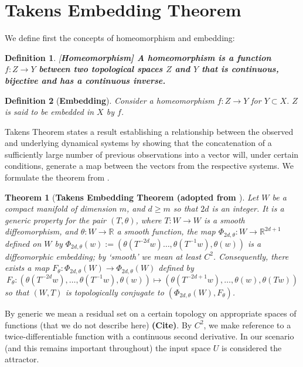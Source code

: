 \documentclass[a4paper,12pt,twoside]{report}
\newtheorem{Definition}{Definition}[]
\newtheorem{Theorem}{Theorem}[]
\begin{document}
\section{Takens Embedding Theorem}\label{sect_Takens}

We define first the concepts of homeomorphism and embedding:
\begin{Definition}\rm
  [\bf {Homeomorphism}]\label{Dfn_homeo}\rm
  A homeomorphism is a function $f:Z\rightarrow Y$ between two topological spaces $Z$ and $Y$ that is continuous, bijective and has a continuous inverse. 
\end{Definition}

\begin{Definition}
  [\bf {Embedding}]\label{Dfn_embed}\rm
  Consider a homeomorphism $f:Z\rightarrow Y$ for $Y\subset X$. $Z$ is said to be embedded in $X$ by $f$.
\end{Definition}

Takens Theorem states a result establishing a relationship between the observed and underlying dynamical systems by showing that the concatenation of a sufficiently large number of previous observations into a vector will, under certain conditions, generate a map between the vectors from the respective systems.  We formulate the theorem from \cite{takens1981detecting}.  

\begin{Theorem} 
	[\bf Takens Embedding Theorem (adopted from \cite{takens1981detecting}] \label{Thm_Takens}
         Let $W$ be a compact manifold of dimension $m$, and $d\ge m$ so that $2d$ is an integer. It is a 
            generic property for the pair $(T, \theta)$,  where $T:W \to W$ is
            a smooth diffeomorphism, and $\theta:W \to \mathbb{R}$ a smooth function, the map $\Phi_{2d,\theta}:W \to \mathbb{R}^{2d+1}$ defined on $W$ by 
            $\Phi_{2d,\theta}(w) := (\theta(T^{-2d}w)\ldots,\theta(T^{-1}w),\theta(w))$
            is a diffeomorphic embedding; by `smooth' we mean at least $C^2$. Consequently, there exists a map $F_\theta: \Phi_{2d,\theta}(W) \to \Phi_{2d,\theta}(W)$ defined by $$F_\theta: (\theta(T^{-2d}w),\ldots,\theta(T^{-1}w),\theta(w)) \mapsto 
            (\theta(T^{-2d+1}w),\ldots,\theta(w),\theta(Tw))$$
           so that $(W,T)$ is topologically conjugate to 
            $(\Phi_{2d,\theta}(W), F_\theta)$.    
\end{Theorem} 

By generic we mean a residual set on a certain topology on appropriate spaces of functions (that we do not describe here) \textbf{(Cite)}. 
By $C^2$, we make reference to a twice-differentiable function  with a continuous second derivative. In our scenario (and this remains important throughout) the input space $U$ is considered the attractor.~\label{attractor_U}
\end{document}
